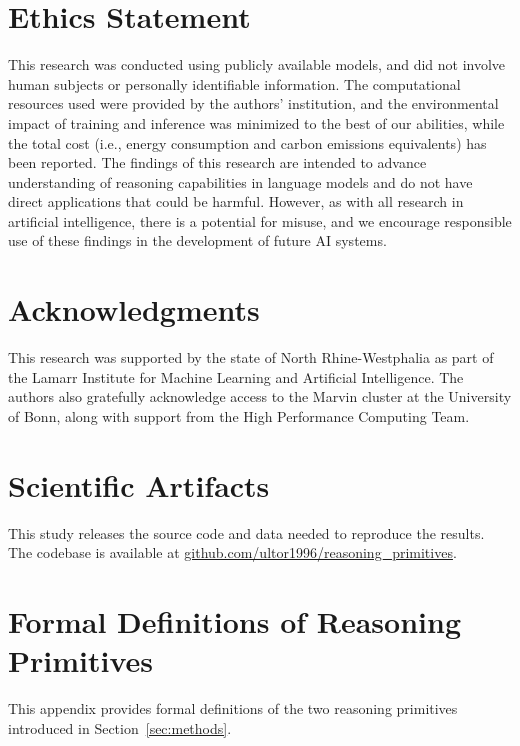 \documentclass[11pt]{article}
\makeatletter
\theoremstyle{definition}
\newif\if@isreview
\newcommand{\redact}[1]{%
  \if@isreview\texttt{[redacted for peer review]}\else#1\fi}
\makeatother
\begin{document}
\section{Ethics Statement}

This research was conducted using publicly available models, and did not involve human subjects or personally identifiable information. The computational resources used were provided by the authors' institution, and the environmental impact of training and inference was minimized to the best of our abilities, while the total cost (i.e., energy consumption and carbon emissions equivalents) has been reported. The findings of this research are intended to advance understanding of reasoning capabilities in language models and do not have direct applications that could be harmful. However, as with all research in artificial intelligence, there is a potential for misuse, and we encourage responsible use of these findings in the development of future AI systems.

\section*{Acknowledgments}

\redact{This research was supported by the state of North Rhine-Westphalia as part of the Lamarr Institute for Machine Learning and Artificial Intelligence. The authors also gratefully acknowledge access to the Marvin cluster at the University of Bonn, along with support from the High Performance Computing Team.}

%


\appendix

\section{Scientific Artifacts}
\label{appendix:scientific-artifacts}

This study releases the source code and data needed to reproduce the results. The codebase is available at \redact{\href{https://github.com/ultor1996/reasoning_primitives}{github.com/ultor1996/reasoning\_primitives}}.

\section{Formal Definitions of Reasoning Primitives}
\label{app:primitives-formal}

This appendix provides formal definitions of the two reasoning primitives introduced in Section~\ref{sec:methods}.
\end{document}
